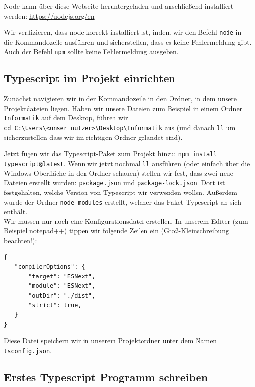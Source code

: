 \documentclass[11pt]{article}
\begin{document}
    Node kann über diese Webseite heruntergeladen und anschließend installiert werden: \url{https://nodejs.org/en}

    Wir verifizieren, dass node korrekt installiert ist, indem wir den Befehl \Verb"node" in die Kommandozeile ausführen
    und sicherstellen, dass es keine Fehlermeldung gibt.
    Auch der Befehl \Verb"npm" sollte keine Fehlermeldung ausgeben.

    \subsection{Typescript im Projekt einrichten}

    Zunächst navigieren wir in der Kommandozeile in den Ordner, in dem unsere Projektdateien liegen.
    Haben wir unsere Dateien zum Beispiel in einem Ordner \Verb"Informatik" auf dem Desktop, führen wir \\
    \Verb"cd C:\Users\<unser nutzer>\Desktop\Informatik" aus (und danach \Verb"ll" um sicherzustellen dass wir im
    richtigen Ordner gelandet sind).

    Jetzt fügen wir das Typescript-Paket zum Projekt hinzu: \Verb"npm install typescript@latest".
    Wenn wir jetzt nochmal \Verb"ll" ausführen (oder einfach über die Windows Oberfläche in den Ordner schauen)
    stellen wir fest, dass zwei neue Dateien erstellt wurden: \Verb"package.json" und \Verb"package-lock.json".
    Dort ist festgehalten, welche Version von Typescript wir verwenden wollen.
    Außerdem wurde der Ordner \Verb"node_modules" erstellt, welcher das Paket Typescript an sich enthält. \\

    Wir müssen nur noch eine Konfigurationsdatei erstellen.
    In unserem Editor (zum Beispiel notepad++) tippen wir folgende Zeilen ein (Groß-Kleinschreibung beachten!):

    \begin{verbatim}
{
   "compilerOptions": {
       "target": "ESNext",
       "module": "ESNext",
       "outDir": "./dist",
       "strict": true,
   }
}
    \end{verbatim}

    Diese Datei speichern wir in unserem Projektordner unter dem Namen \Verb"tsconfig.json".

    \subsection{Erstes Typescript Programm schreiben}
\end{document}
